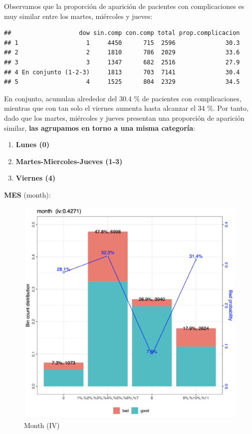 \documentclass[
]{article}
\providecommand{\tightlist}{%
  \setlength{\itemsep}{0pt}\setlength{\parskip}{0pt}}
\begin{document}
Observamos que la proporción de aparición de pacientes con
complicaciones es muy similar entre los martes, miércoles y jueves:

\begin{verbatim}
##                   dow sin.comp con.comp total prop.complicacion
## 1                   1     4450      715  2596              30.3
## 2                   2     1810      786  2029              33.6
## 3                   3     1347      682  2516              27.9
## 4 En conjunto (1-2-3)     1813      703  7141              30.4
## 5                   4     1525      804  2329              34.5
\end{verbatim}

En conjunto, acumulan alrededor del 30.4 \% de pacientes con
complicaciones, mientras que con tan solo el viernes aumenta hasta
alcanzar el 34 \%. Por tanto, dado que los martes, miércoles y jueves
presentan una proporción de aparición similar, \textbf{las agrupamos en
torno a una misma categoría}:

\begin{enumerate}
\def\labelenumi{\arabic{enumi}.}
\tightlist
\item
  \textbf{Lunes (0)}
\item
  \textbf{Martes-Miercoles-Jueves (1-3)}
\item
  \textbf{Viernes (4)}
\end{enumerate}

\textbf{MES} (month):

\begin{figure}[h!]

{\centering \includegraphics[width=0.75\linewidth,height=0.75\textheight,]{./capturas/Depuracion/month} 

}

\caption{Month (IV)}\label{fig:unnamed-chunk-15}
\end{figure}
\end{document}
